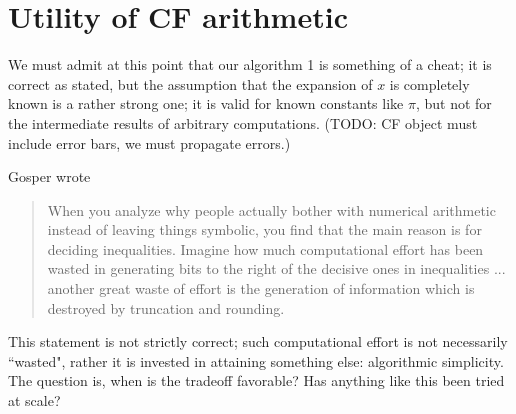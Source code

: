 \documentclass[11pt, oneside]{amsart}   	%
\begin{document}
\section{Utility of CF arithmetic}
We must admit at this point that our algorithm 1 is something of a cheat; it is correct as stated, but the assumption that the expansion of $x$ is completely known is a rather strong one; it is valid for known constants like $\pi$, but not for the intermediate results of arbitrary computations. (TODO: CF object must include error bars, we must propagate errors.)

Gosper wrote 
\begin{quote}
When you analyze why people actually bother with numerical arithmetic instead of leaving things symbolic, you find that the main reason is for deciding inequalities. Imagine how much computational effort has been wasted in generating bits to the right of the decisive ones in inequalities ... another great waste of effort is the generation of information which is destroyed by truncation and rounding.
\end{quote}
 This statement is not strictly correct; such computational effort is not necessarily ``wasted", rather it is invested in attaining something else: algorithmic simplicity. The question is, when is the tradeoff favorable? Has anything like this been tried at scale?
\end{document}
